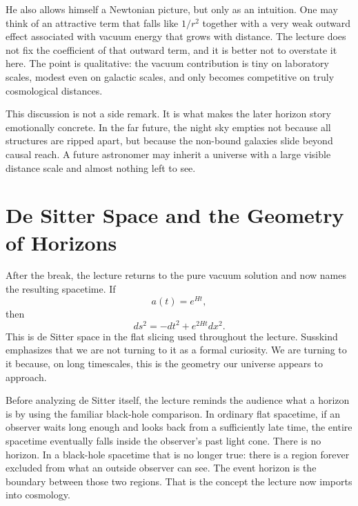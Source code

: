 He also allows himself a Newtonian picture, but only as an intuition. One may think of an attractive term that falls like \(1/r^2\) together with a very weak outward effect associated with vacuum energy that grows with distance. The lecture does not fix the coefficient of that outward term, and it is better not to overstate it here. The point is qualitative: the vacuum contribution is tiny on laboratory scales, modest even on galactic scales, and only becomes competitive on truly cosmological distances.

This discussion is not a side remark. It is what makes the later horizon story emotionally concrete. In the far future, the night sky empties not because all structures are ripped apart, but because the non-bound galaxies slide beyond causal reach. A future astronomer may inherit a universe with a large visible distance scale and almost nothing left to see.

\section{De Sitter Space and the Geometry of Horizons}

After the break, the lecture returns to the pure vacuum solution and now names the resulting spacetime. If
\begin{equation}
a(t)=e^{Ht},
\end{equation}
then
\begin{equation}
ds^2=-dt^2+e^{2Ht}dx^2.
\end{equation}
This is de Sitter space in the flat slicing used throughout the lecture. Susskind emphasizes that we are not turning to it as a formal curiosity. We are turning to it because, on long timescales, this is the geometry our universe appears to approach.

Before analyzing de Sitter itself, the lecture reminds the audience what a horizon is by using the familiar black-hole comparison. In ordinary flat spacetime, if an observer waits long enough and looks back from a sufficiently late time, the entire spacetime eventually falls inside the observer's past light cone. There is no horizon. In a black-hole spacetime that is no longer true: there is a region forever excluded from what an outside observer can see. The event horizon is the boundary between those two regions. That is the concept the lecture now imports into cosmology.

